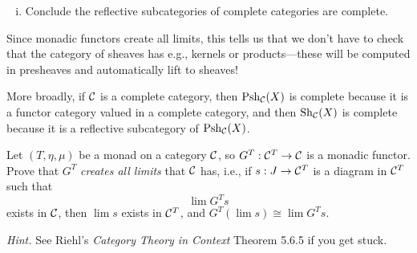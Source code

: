 \documentclass[12pt]{article}
\DeclareMathOperator{\Psh}{Psh}
\DeclareMathOperator{\Sh}{Sh}
\begin{document}
\begin{problem}
\begin{enumerate}[(i)]
        \textit{Fact.} In an adjunction $\adjunction{\cC}{\cD}{F}{G}$, if $G$ is fully faithful, then the counit $\eps$ is a natural isomorphism (i.e., each component has an inverse).

        \bigskip
        
        \item Conclude the reflective subcategories of complete categories are complete.
    \end{enumerate}
\end{problem}

\bigskip

\begin{rmk}
    Since monadic functors create all limits, this tells us that we don't have to check that the category of sheaves has e.g., kernels or products---these will be computed in presheaves and automatically lift to sheaves!

    More broadly, if $\mathcal{C}$ is a complete category, then $\Psh_\cC(X)$ is complete because it is a functor category valued in a complete category, and then $\Sh_\cC(X)$ is complete because it is a reflective subcategory of $\Psh_\cC(X)$.
\end{rmk}

\bigskip

\begin{problem}
    Let $(T,\eta,\mu)$ be a monad on a category $\mathcal{C}$, so $G^T: \mathcal{C}^T \to \mathcal{C}$ is a monadic functor. Prove that $G^T$ \textit{creates all limits} that $\mathcal{C}$ has, i.e., if $s: J\to \mathcal{C}^T$ is a diagram in $\mathcal{C}^T$ such that
    \[\lim G^Ts\]
    exists in $\mathcal{C}$, then $\lim s$ exists in $\mathcal{C}^T$, and $G^T(\lim s) \cong \lim G^T s$.

    \textit{Hint.} See Riehl's \textit{Category Theory in Context} Theorem 5.6.5 if you get stuck.
\end{problem}
\end{document}
